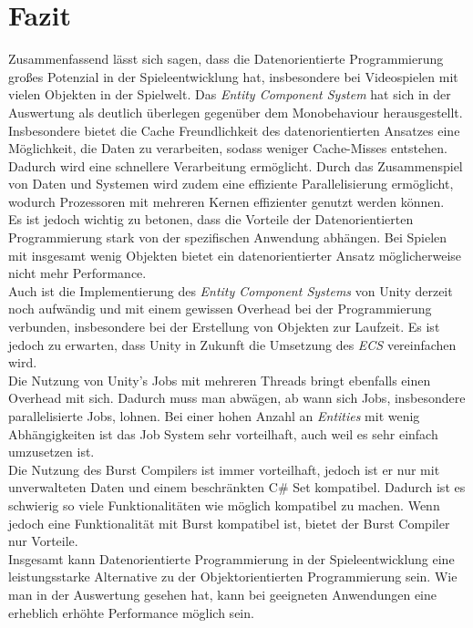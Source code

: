 \section{Fazit}
Zusammenfassend lässt sich sagen, dass die Datenorientierte Programmierung großes Potenzial in der Spieleentwicklung hat, insbesondere bei Videospielen mit vielen Objekten in der Spielwelt. Das \textit{Entity Component System} hat sich in der Auswertung als deutlich überlegen gegenüber dem Monobehaviour herausgestellt. Insbesondere bietet die Cache Freundlichkeit des datenorientierten Ansatzes eine Möglichkeit, die Daten zu verarbeiten, sodass weniger Cache-Misses entstehen. Dadurch wird eine schnellere Verarbeitung ermöglicht. Durch das Zusammenspiel von Daten und Systemen wird zudem eine effiziente Parallelisierung ermöglicht, wodurch Prozessoren mit mehreren Kernen effizienter genutzt werden können.\\
Es ist jedoch wichtig zu betonen, dass die Vorteile der Datenorientierten Programmierung stark von der spezifischen Anwendung abhängen. Bei Spielen mit insgesamt wenig Objekten bietet ein datenorientierter Ansatz möglicherweise nicht mehr Performance.\\
Auch ist die Implementierung des \textit{Entity Component Systems} von Unity derzeit noch aufwändig und mit einem gewissen Overhead bei der Programmierung verbunden, insbesondere bei der Erstellung von Objekten zur Laufzeit. Es ist jedoch zu erwarten, dass Unity in Zukunft die Umsetzung des \textit{ECS} vereinfachen wird.\\
Die Nutzung von Unity's Jobs mit mehreren Threads bringt ebenfalls einen Overhead mit sich. Dadurch muss man abwägen, ab wann sich Jobs, insbesondere parallelisierte Jobs, lohnen. Bei einer hohen Anzahl an \textit{Entities} mit wenig Abhängigkeiten ist das Job System sehr vorteilhaft, auch weil es sehr einfach umzusetzen ist.\\
Die Nutzung des Burst Compilers ist immer vorteilhaft, jedoch ist er nur mit unverwalteten Daten und einem beschränkten C\# Set kompatibel. Dadurch ist es schwierig so viele Funktionalitäten wie möglich kompatibel zu machen. Wenn jedoch eine Funktionalität mit Burst kompatibel ist, bietet der Burst Compiler nur Vorteile.\\
Insgesamt kann Datenorientierte Programmierung in der Spieleentwicklung eine leistungsstarke Alternative zu der Objektorientierten Programmierung sein. Wie man in der Auswertung gesehen hat, kann bei geeigneten Anwendungen eine erheblich erhöhte Performance möglich sein.
